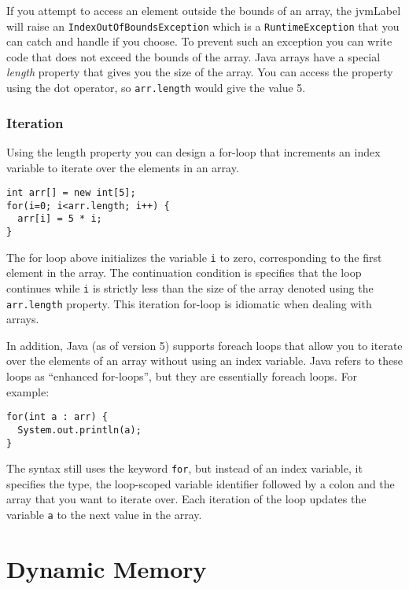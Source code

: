 If you attempt to access an element outside the bounds of
an array, the \gls{jvmLabel} will raise an \texttt{IndexOutOfBoundsException}
which is a \texttt{RuntimeException} that you can
catch and handle if you choose.  To prevent such an exception
you can write code that does not exceed the bounds of the
array.  Java arrays have a special \emph{length} property that
gives you the size of the array.  You can access the property
using the dot operator, so \texttt{arr.length} would
give the value 5.  

\subsubsection{Iteration}

Using the length property you can design a for-loop that
increments an index variable to iterate over the elements in
an array.

\begin{verbatim}
int arr[] = new int[5];
for(i=0; i<arr.length; i++) {
  arr[i] = 5 * i;
}
\end{verbatim}

The for loop above initializes the variable \texttt{i} to zero,
corresponding to the first element in the array.  The continuation
condition is specifies that the loop continues while \texttt{i}
is strictly less than the size of the array denoted using the
\texttt{arr.length} property.  This iteration for-loop
is idiomatic when dealing with arrays.

In addition, Java (as of version 5) supports foreach loops that 
allow you to iterate over the elements of an array without using
an index variable.  Java refers to these loops as ``enhanced
for-loops'', but they are essentially foreach loops.  For example:

\begin{verbatim}
for(int a : arr) {
  System.out.println(a);
}
\end{verbatim}

The syntax still uses the keyword \texttt{for}, but instead
of an index variable, it specifies the type, the loop-scoped variable
identifier followed by a colon and the array that you want to iterate
over.  Each iteration of the loop updates the variable \texttt{a}
to the next value in the array.  

\section{Dynamic Memory}


